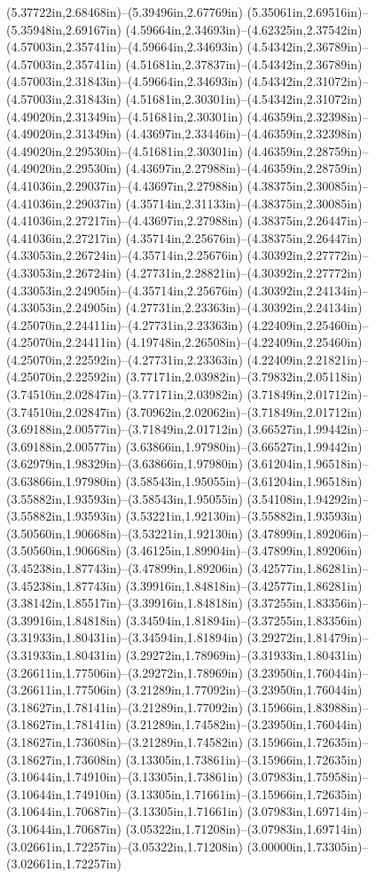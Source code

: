 (5.37722in,2.68468in)--(5.39496in,2.67769in) (5.35061in,2.69516in)--(5.35948in,2.69167in) (4.59664in,2.34693in)--(4.62325in,2.37542in) (4.57003in,2.35741in)--(4.59664in,2.34693in) (4.54342in,2.36789in)--(4.57003in,2.35741in) (4.51681in,2.37837in)--(4.54342in,2.36789in) (4.57003in,2.31843in)--(4.59664in,2.34693in) (4.54342in,2.31072in)--(4.57003in,2.31843in) (4.51681in,2.30301in)--(4.54342in,2.31072in) (4.49020in,2.31349in)--(4.51681in,2.30301in) (4.46359in,2.32398in)--(4.49020in,2.31349in) (4.43697in,2.33446in)--(4.46359in,2.32398in) (4.49020in,2.29530in)--(4.51681in,2.30301in) (4.46359in,2.28759in)--(4.49020in,2.29530in) (4.43697in,2.27988in)--(4.46359in,2.28759in) (4.41036in,2.29037in)--(4.43697in,2.27988in) (4.38375in,2.30085in)--(4.41036in,2.29037in) (4.35714in,2.31133in)--(4.38375in,2.30085in) (4.41036in,2.27217in)--(4.43697in,2.27988in) (4.38375in,2.26447in)--(4.41036in,2.27217in) (4.35714in,2.25676in)--(4.38375in,2.26447in) (4.33053in,2.26724in)--(4.35714in,2.25676in) (4.30392in,2.27772in)--(4.33053in,2.26724in) (4.27731in,2.28821in)--(4.30392in,2.27772in) (4.33053in,2.24905in)--(4.35714in,2.25676in) (4.30392in,2.24134in)--(4.33053in,2.24905in) (4.27731in,2.23363in)--(4.30392in,2.24134in) (4.25070in,2.24411in)--(4.27731in,2.23363in) (4.22409in,2.25460in)--(4.25070in,2.24411in) (4.19748in,2.26508in)--(4.22409in,2.25460in) (4.25070in,2.22592in)--(4.27731in,2.23363in) (4.22409in,2.21821in)--(4.25070in,2.22592in) (3.77171in,2.03982in)--(3.79832in,2.05118in) (3.74510in,2.02847in)--(3.77171in,2.03982in) (3.71849in,2.01712in)--(3.74510in,2.02847in) (3.70962in,2.02062in)--(3.71849in,2.01712in) (3.69188in,2.00577in)--(3.71849in,2.01712in) (3.66527in,1.99442in)--(3.69188in,2.00577in) (3.63866in,1.97980in)--(3.66527in,1.99442in) (3.62979in,1.98329in)--(3.63866in,1.97980in) (3.61204in,1.96518in)--(3.63866in,1.97980in) (3.58543in,1.95055in)--(3.61204in,1.96518in) (3.55882in,1.93593in)--(3.58543in,1.95055in) (3.54108in,1.94292in)--(3.55882in,1.93593in) (3.53221in,1.92130in)--(3.55882in,1.93593in) (3.50560in,1.90668in)--(3.53221in,1.92130in) (3.47899in,1.89206in)--(3.50560in,1.90668in) (3.46125in,1.89904in)--(3.47899in,1.89206in) (3.45238in,1.87743in)--(3.47899in,1.89206in) (3.42577in,1.86281in)--(3.45238in,1.87743in) (3.39916in,1.84818in)--(3.42577in,1.86281in) (3.38142in,1.85517in)--(3.39916in,1.84818in) (3.37255in,1.83356in)--(3.39916in,1.84818in) (3.34594in,1.81894in)--(3.37255in,1.83356in) (3.31933in,1.80431in)--(3.34594in,1.81894in) (3.29272in,1.81479in)--(3.31933in,1.80431in) (3.29272in,1.78969in)--(3.31933in,1.80431in) (3.26611in,1.77506in)--(3.29272in,1.78969in) (3.23950in,1.76044in)--(3.26611in,1.77506in) (3.21289in,1.77092in)--(3.23950in,1.76044in) (3.18627in,1.78141in)--(3.21289in,1.77092in) (3.15966in,1.83988in)--(3.18627in,1.78141in) (3.21289in,1.74582in)--(3.23950in,1.76044in) (3.18627in,1.73608in)--(3.21289in,1.74582in) (3.15966in,1.72635in)--(3.18627in,1.73608in) (3.13305in,1.73861in)--(3.15966in,1.72635in) (3.10644in,1.74910in)--(3.13305in,1.73861in) (3.07983in,1.75958in)--(3.10644in,1.74910in) (3.13305in,1.71661in)--(3.15966in,1.72635in) (3.10644in,1.70687in)--(3.13305in,1.71661in) (3.07983in,1.69714in)--(3.10644in,1.70687in) (3.05322in,1.71208in)--(3.07983in,1.69714in) (3.02661in,1.72257in)--(3.05322in,1.71208in) (3.00000in,1.73305in)--(3.02661in,1.72257in) 